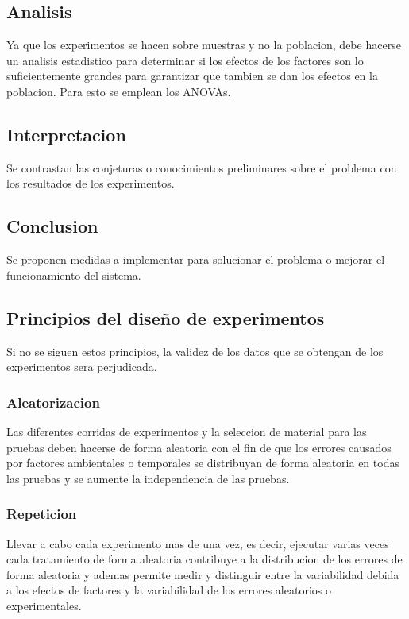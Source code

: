 \documentclass[a4paper]{article}
\begin{document}
\subsection*{Analisis}
Ya que los experimentos se hacen sobre muestras y no la poblacion, debe hacerse un analisis estadistico para
determinar si los efectos de los factores son lo suficientemente grandes para garantizar que tambien se dan los 
efectos en la poblacion. Para esto se emplean los ANOVAs.

\subsection*{Interpretacion}
Se contrastan las conjeturas o conocimientos preliminares sobre el problema con los resultados de los experimentos.

\subsection*{Conclusion}
Se proponen medidas a implementar para solucionar el problema o mejorar el funcionamiento del sistema.

\subsection*{Principios del diseño de experimentos}
Si no se siguen estos principios, la validez de los datos que se obtengan de los experimentos sera perjudicada.

\subsubsection*{Aleatorizacion}
Las diferentes corridas de experimentos y la seleccion de material para las pruebas deben hacerse de forma 
aleatoria con el fin de que los errores causados por factores ambientales o temporales se distribuyan de forma 
aleatoria en todas las pruebas y se aumente la independencia de las pruebas.

\subsubsection*{Repeticion}
Llevar a cabo cada experimento mas de una vez, es decir, ejecutar varias veces cada tratamiento de forma aleatoria 
contribuye a la distribucion de los errores de forma aleatoria y ademas permite medir y distinguir entre la variabilidad 
debida a los efectos de factores y la variabilidad de los errores aleatorios o experimentales.
\end{document}
